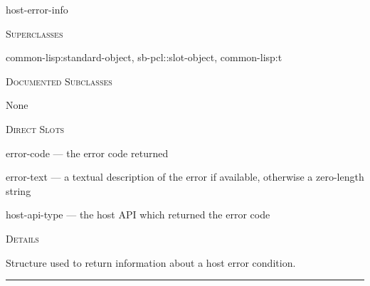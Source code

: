 \documentclass[a4paper]{report}
\begin{document}
    \label{portaudio__class__host-error-info}
    \begin{defun}[Class]
    host-error-info


      
    \bigskip
    \textsc{Superclasses}

\color[rgb]{0.5,0.5,0.5}common-lisp:standard-object\color[rgb]{0,0,0}, \color[rgb]{0.5,0.5,0.5}sb-pcl::slot-object\color[rgb]{0,0,0}, \color[rgb]{0.5,0.5,0.5}common-lisp:t\color[rgb]{0,0,0}


      
    \bigskip
    \textsc{Documented Subclasses}


	    None
	  


	
    \bigskip
    \textsc{Direct Slots}

error-code --- the error code returned

error-text --- a textual description of the error if available, otherwise a zero-length string

host-api-type --- the host API which returned the error code




	
    \bigskip
    \textsc{Details}

Structure used to return information about a host error condition.


    
    \end{defun}
  
  

    \rule{\linewidth}{0.1mm}
    
\end{document}
